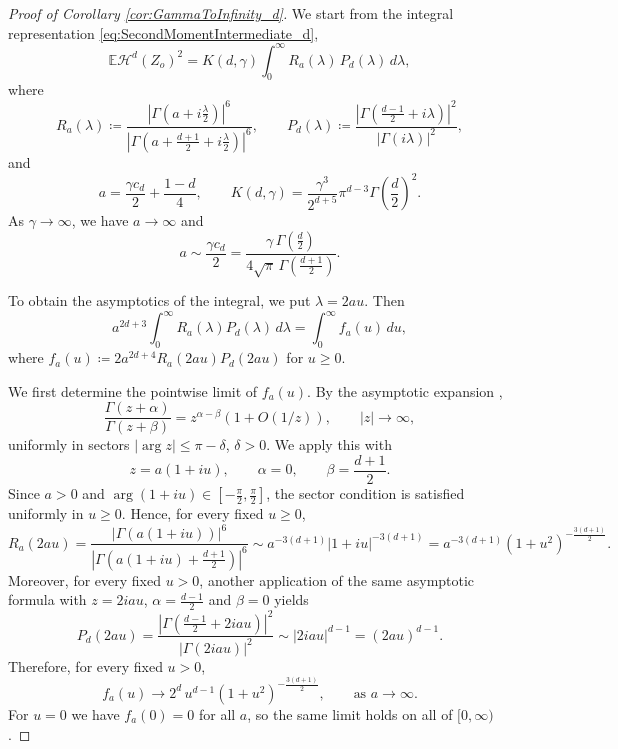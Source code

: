 \documentclass[11pt,a4paper]{article}
\theoremstyle{plain}
\theoremstyle{definition}
\theoremstyle{remark}
\def\EE{\mathbb{E}}
\def\cH{\mathcal{H}}
\begin{document}
\begin{proof}[Proof of Corollary \ref{cor:GammaToInfinity_d}]
    We start from the integral representation \eqref{eq:SecondMomentIntermediate_d},
	\[
	\EE\cH^d(Z_o)^2
	=
	K(d,\gamma)
	\int_0^\infty
	R_a(\lambda)\,P_d(\lambda)\,d\lambda,
	\]
	where
	\[
	R_a(\lambda)\coloneqq
	\frac{\left| \Gamma\left(a + i\frac{\lambda}{2}\right) \right|^6}{
		\left| \Gamma\left(a + \frac{d+1}{2} + i\frac{\lambda}{2}\right) \right|^6},
	\qquad
	P_d(\lambda)\coloneqq
	\frac{\left| \Gamma\left(\frac{d-1}{2} + i\lambda\right) \right|^2}{
		\left| \Gamma(i\lambda) \right|^2},
	\]
	and
	\[
	a=\frac{\gamma c_d}{2}+\frac{1-d}{4},
	\qquad
	K(d,\gamma)=\frac{\gamma^3}{2^{d+5}}\pi^{d-3}\Gamma\!\left(\frac d2\right)^2.
	\]
	As $\gamma\to\infty$, we have $a\to\infty$ and
	\[
	a\sim \frac{\gamma c_d}{2}
	=
	\frac{\gamma\,\Gamma\!\left(\frac d2\right)}{4\sqrt{\pi}\,\Gamma\!\left(\frac{d+1}{2}\right)}.
	\]

	To obtain the asymptotics of the integral, we put $\lambda=2au$.
	Then
	\[
	a^{2d+3}\int_0^\infty R_a(\lambda)P_d(\lambda)\,d\lambda
	=
	\int_0^\infty f_a(u)\,du,
	\]
	where $f_a(u)\coloneqq 2a^{2d+4}R_a(2au)P_d(2au)$ for $u\geq 0$.

	We first determine the pointwise limit of $f_a(u)$. By the asymptotic expansion
	\cite[Formula 5.11.13]{NIST},
    \begin{equation}\label{eq:gamma_ratio}
    \frac{\Gamma(z+\alpha)}{\Gamma(z+\beta)}
	=
	z^{\alpha-\beta}(1+O(1/z)),
	\qquad |z|\to\infty,
    \end{equation}
	uniformly in sectors $|\arg z|\le \pi-\delta$, $\delta > 0$.
    We apply this with
	\[
	z=a(1+iu),\qquad \alpha=0,\qquad \beta=\frac{d+1}{2}.
	\]
	Since $a>0$ and $\arg(1+iu)\in[-\frac{\pi}{2},\frac{\pi}{2}]$, the sector condition is satisfied uniformly in $u\ge 0$. Hence, for every fixed $u\ge 0$,
	\[
	R_a(2au)
	=
	\frac{|\Gamma(a(1+iu))|^6}{|\Gamma(a(1+iu)+\frac{d+1}{2})|^6}
	\sim
	a^{-3(d+1)}|1+iu|^{-3(d+1)}
	=
	a^{-3(d+1)}(1+u^2)^{-\frac{3(d+1)}{2}}.
	\]
	Moreover, for every fixed $u>0$, another application of the same asymptotic formula with
	$z=2iau$, $\alpha=\frac{d-1}{2}$ and $\beta=0$ yields
	\[
	P_d(2au)
	=
	\frac{\left| \Gamma\left(\frac{d-1}{2} + 2iau\right) \right|^2}{
		\left| \Gamma(2iau) \right|^2}
	\sim
	|2iau|^{d-1}
	=
	(2au)^{d-1}.
	\]
	Therefore, for every fixed $u>0$,
	\[
	f_a(u)
	\to
	2^d\,u^{d-1}(1+u^2)^{-\frac{3(d+1)}{2}},
	\qquad\text{as } a\to\infty.
	\]
	For $u=0$ we have $f_a(0)=0$ for all $a$, so the same limit holds on all of $[0,\infty)$.


\end{proof}
\end{document}
